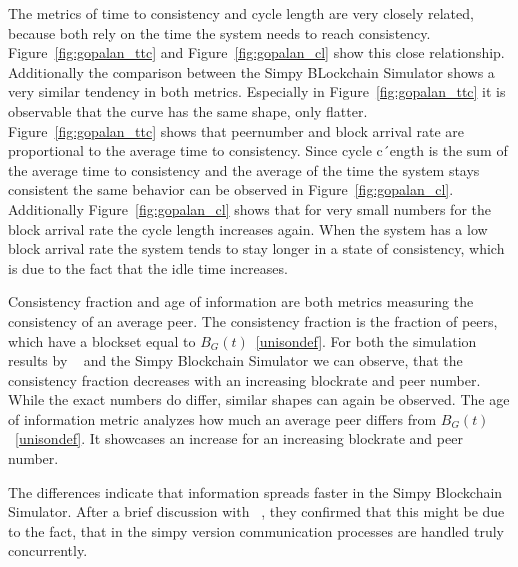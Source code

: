 The metrics of time to consistency and cycle length are very closely related, because both rely on the time the system needs to reach consistency.
Figure~\ref{fig:gopalan_ttc} and Figure~\ref{fig:gopalan_cl} show this close relationship. Additionally the comparison between the Simpy BLockchain Simulator shows a very similar tendency in both metrics. Especially in Figure~\ref{fig:gopalan_ttc} it is observable that the curve has the same shape, only flatter. Figure~\ref{fig:gopalan_ttc} shows that peernumber and block arrival rate are proportional to the average time to consistency. Since cycle c´ength is the sum of the average time to consistency and the average of the time the system stays consistent the same behavior can be observed in Figure~\ref{fig:gopalan_cl}. Additionally Figure~\ref{fig:gopalan_cl} shows that for very small numbers for the block arrival rate the cycle length increases again. When the system has a low block arrival rate the system tends to stay longer in a state of consistency, which is due to the fact that the idle time increases.

Consistency fraction and age of information are both metrics measuring the consistency of an average peer. The consistency fraction is the fraction of peers, which have a blockset equal to $B_G(t)$~\ref{unisondef}. For both the simulation results by \gopalan~ and the Simpy Blockchain Simulator we can observe, that the consistency fraction decreases with an increasing blockrate and peer number. While the exact numbers do differ, similar shapes can again be observed.
The age of information metric analyzes how much an average peer differs from $B_G(t)$~\ref{unisondef}. It showcases an increase for an increasing blockrate and peer number.

The differences indicate that information spreads faster in the Simpy Blockchain Simulator. After a brief discussion with \gopalan~, they confirmed that this might be due to the fact, that in the simpy version communication processes are handled truly concurrently.	

